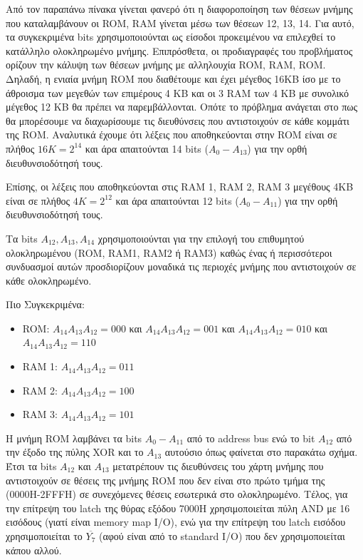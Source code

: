 \documentclass[a4paper]{article}
\begin{document}
Από τον παραπάνω πίνακα γίνεται φανερό ότι η διαφοροποίηση των θέσεων μνήμης που καταλαμβάνουν οι ROM, RAM γίνεται μέσω των θέσεων 12, 13, 14. Για αυτό, τα συγκεκριμένα bits χρησιμοποιούνται ως είσοδοι προκειμένου να επιλεχθεί το κατάλληλο ολοκληρωμένο μνήμης. Επιπρόσθετα, οι προδιαγραφές του προβλήματος ορίζουν την κάλυψη των θέσεων μνήμης με αλληλουχία ROM, RAM, ROM. Δηλαδή, η ενιαία μνήμη ROM που διαθέτουμε και έχει μέγεθος 16ΚΒ ίσο με το άθροισμα των μεγεθών των επιμέρους 4 ΚΒ και οι 3 RAM των 4 KB με συνολικό μέγεθος 12 KB θα πρέπει
να παρεμβάλλονται. Οπότε το πρόβλημα ανάγεται στο πως θα μπορέσουμε να διαχωρίσουμε τις διευθύνσεις που αντιστοιχούν σε κάθε κομμάτι της ROM.  Αναλυτικά έχουμε ότι λέξεις που αποθηκεύονται στην  ROM είναι σε πλήθος $16 K = 2^{14}$ και άρα απαιτούνται 14 bits ($Α_0-Α_{13}$) για την ορθή διευθυνσιοδότησή τους. 

Επίσης, οι λέξεις που αποθηκεύονται στις RAM 1, RAM 2, RAM 3 μεγέθους 4KB είναι σε πλήθος $4 K = 2^{12}$ και άρα απαιτούνται 12 bits ($Α_{0}-Α_{11}$) για την ορθή διευθυνσιοδότησή τους. 

Τα bits $Α_{12}, Α_{13}, Α_{14}$ χρησιμοποιούνται για την επιλογή του επιθυμητού ολοκληρωμένου (ROM, RAM1, RAM2 ή RAM3) καθώς ένας ή περισσότεροι συνδυασμοί αυτών προσδιορίζουν μοναδικά τις περιοχές μνήμης που αντιστοιχούν σε κάθε ολοκληρωμένο.
 
Πιο Συγκεκριμένα:

\begin{itemize}
\item ROM: $Α_{14}Α_{13}Α_{12} = 000$ και $Α_{14}Α_{13}Α_{12} = 001$ και $Α_{14}Α_{13}Α_{12} = 010$ και $Α_{14}Α_{13}Α_{12} = 110$
\item RAM 1: $Α_{14}Α_{13}Α_{12} = 011$
\item RAM 2: $Α_{14}Α_{13}Α_{12} = 100$
\item RAM 3: $Α_{14}Α_{13}Α_{12} = 101$
\end{itemize}

Η μνήμη ROM λαμβάνει τα bits $Α_{0}-Α_{11}$ από το address bus ενώ το bit $Α_{12}$ από την έξοδο της πύλης XOR και το $Α_{13}$ αυτούσιο όπως φαίνεται στο παρακάτω σχήμα. Έτσι τα bits $A_{12}$ και  $A_{13}$ μετατρέπουν τις διευθύνσεις του χάρτη μνήμης που αντιστοιχούν σε θέσεις της μνήμης ROM που δεν είναι στο πρώτο τμήμα της (0000Η-2FFFH) σε συνεχόμενες θέσεις εσωτερικά στο ολοκληρωμένο. Τέλος, για την επίτρεψη του latch της θύρας εξόδου 7000Η χρησιμοποιείται πύλη AND με 16 εισόδους (γιατί είναι memory map I/O), ενώ για την επίτρεψη του latch εισόδου χρησιμοποιείται το  $\overline{Y_7}$ (αφού είναι από το standard I/O) που δεν χρησιμοποιείται κάπου αλλού.
\end{document}
